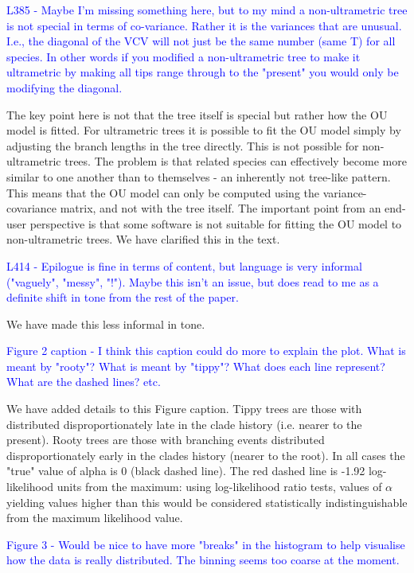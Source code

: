 \documentclass[12pt]{letter}
\begin{document}
\begin{letter}{}
\textcolor{blue}{L385 - Maybe I'm missing something here, but to my mind a non-ultrametric tree is not special in terms of co-variance. Rather it is the variances that are unusual. I.e., the diagonal of the VCV will not just be the same number (same T) for all species. In other words if you modified a non-ultrametric tree to make it ultrametric by making all tips range through to the "present" you would only be modifying the diagonal.}

The key point here is not that the tree itself is special but rather how the OU model is fitted. For ultrametric trees it is possible to fit the OU model simply by adjusting the branch lengths in the tree directly. This is not possible for non-ultrametric trees. The problem is that related species can effectively become more similar to one another than to themselves - an inherently not tree-like pattern. This means that the OU model can only be computed using the variance-covariance matrix, and not with the tree itself. The important point from an end-user perspective is that some software is not suitable for fitting the OU model to non-ultrametric trees. We have clarified this in the text.

\textcolor{blue}{L414 - Epilogue is fine in terms of content, but language is very informal ("vaguely", "messy", "!"). Maybe this isn't an issue, but does read to me as a definite shift in tone from the rest of the paper.}

We have made this less informal in tone.

\textcolor{blue}{Figure 2 caption - I think this caption could do more to explain the plot. What is meant by "rooty"? What is meant by "tippy"? What does each line represent? What are the dashed lines? etc.}

We have added details to this Figure caption. Tippy trees are those with distributed disproportionately late in the clade history (i.e. nearer to the present). Rooty trees are those with branching events distributed disproportionately early in the clades history (nearer to the root). In all cases the "true" value of alpha is 0 (black dashed line). The red dashed line is -1.92 log-likelihood units from the maximum: using log-likelihood ratio tests, values of $\alpha$ yielding values higher than this would be considered statistically indistinguishable from the maximum likelihood value.  

\textcolor{blue}{Figure 3 - Would be nice to have more "breaks" in the histogram to help visualise how the data is really distributed. The binning seems too coarse at the moment.}


\end{letter}
\end{document}
